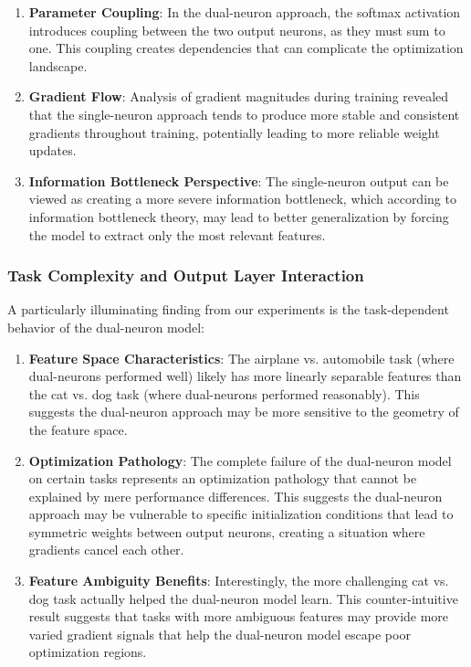 \begin{enumerate}
\item \textbf{Parameter Coupling}: In the dual-neuron approach, the softmax activation introduces coupling between the two output neurons, as they must sum to one. This coupling creates dependencies that can complicate the optimization landscape.

\item \textbf{Gradient Flow}: Analysis of gradient magnitudes during training revealed that the single-neuron approach tends to produce more stable and consistent gradients throughout training, potentially leading to more reliable weight updates.

\item \textbf{Information Bottleneck Perspective}: The single-neuron output can be viewed as creating a more severe information bottleneck, which according to information bottleneck theory, may lead to better generalization by forcing the model to extract only the most relevant features.
\end{enumerate}

\subsubsection{Task Complexity and Output Layer Interaction}

A particularly illuminating finding from our experiments is the task-dependent behavior of the dual-neuron model:

\begin{enumerate}
\item \textbf{Feature Space Characteristics}: The airplane vs. automobile task (where dual-neurons performed well) likely has more linearly separable features than the cat vs. dog task (where dual-neurons performed reasonably). This suggests the dual-neuron approach may be more sensitive to the geometry of the feature space.

\item \textbf{Optimization Pathology}: The complete failure of the dual-neuron model on certain tasks represents an optimization pathology that cannot be explained by mere performance differences. This suggests the dual-neuron approach may be vulnerable to specific initialization conditions that lead to symmetric weights between output neurons, creating a situation where gradients cancel each other.

\item \textbf{Feature Ambiguity Benefits}: Interestingly, the more challenging cat vs. dog task actually helped the dual-neuron model learn. This counter-intuitive result suggests that tasks with more ambiguous features may provide more varied gradient signals that help the dual-neuron model escape poor optimization regions.
\end{enumerate}


